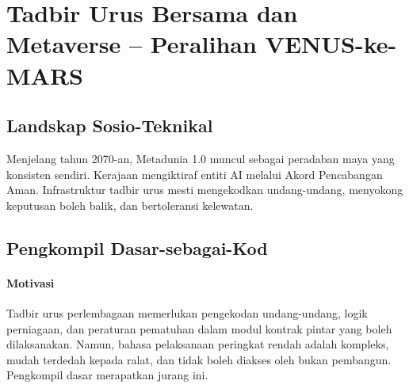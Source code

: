 \documentclass[11pt]{article}
\begin{document}
\section{Tadbir Urus Bersama dan Metaverse -- Peralihan VENUS-ke-MARS}
\subsection{Landskap Sosio-Teknikal}
Menjelang tahun 2070-an, Metadunia 1.0 muncul sebagai peradaban maya yang konsisten sendiri. Kerajaan mengiktiraf entiti AI melalui Akord Pencabangan Aman. Infrastruktur tadbir urus mesti mengekodkan undang-undang, menyokong keputusan boleh balik, dan bertoleransi kelewatan.

\subsection{Pengkompil Dasar-sebagai-Kod}
\label{sec:policy-compiler}
\paragraph{Motivasi} Tadbir urus perlembagaan memerlukan pengekodan undang-undang, logik perniagaan, dan peraturan pematuhan dalam modul kontrak pintar yang boleh dilaksanakan. Namun, bahasa pelaksanaan peringkat rendah adalah kompleks, mudah terdedah kepada ralat, dan tidak boleh diakses oleh bukan pembangun. Pengkompil dasar merapatkan jurang ini.
\end{document}
